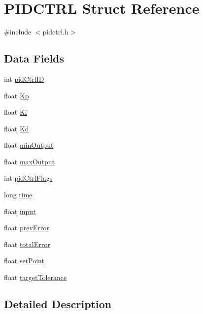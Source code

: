 \hypertarget{struct_p_i_d_c_t_r_l}{
\section{PIDCTRL Struct Reference}
\label{struct_p_i_d_c_t_r_l}
}


{\ttfamily \#include $<$pidctrl.h$>$}

\subsection*{Data Fields}
\begin{DoxyCompactItemize}
\item 
int \hyperlink{struct_p_i_d_c_t_r_l_a476d031d1a50fa42f1cebebf6e19d8a2}{pidCtrlID}
\item 
float \hyperlink{struct_p_i_d_c_t_r_l_a09cfc766a233ad617270562cc4146d07}{Kp}
\item 
float \hyperlink{struct_p_i_d_c_t_r_l_a59fac16f568541187ff485c4c47b0ec5}{Ki}
\item 
float \hyperlink{struct_p_i_d_c_t_r_l_a98268d71502ba080d88a9b1f50fdbe80}{Kd}
\item 
float \hyperlink{struct_p_i_d_c_t_r_l_aa600beb284fe9eb85dd0e23dbb76ea12}{minOutput}
\item 
float \hyperlink{struct_p_i_d_c_t_r_l_a69c7c584610d93d038b17f08d46b4fa1}{maxOutput}
\item 
int \hyperlink{struct_p_i_d_c_t_r_l_a22df833968e881351b347f467627da04}{pidCtrlFlags}
\item 
long \hyperlink{struct_p_i_d_c_t_r_l_a8667588dec524bf854d0c16771d425a1}{time}
\item 
float \hyperlink{struct_p_i_d_c_t_r_l_a0c92b536886cab3f637dce4b7a0956bd}{input}
\item 
float \hyperlink{struct_p_i_d_c_t_r_l_a39a4faa3bd5fbec63bad922745e90e53}{prevError}
\item 
float \hyperlink{struct_p_i_d_c_t_r_l_a4493bf9bc4dbf87a1d24fdd875b89dde}{totalError}
\item 
float \hyperlink{struct_p_i_d_c_t_r_l_a63d3c3044414027c2686db00ea9cca32}{setPoint}
\item 
float \hyperlink{struct_p_i_d_c_t_r_l_ac9724415d7343c756012787cb48fcbe3}{targetTolerance}
\end{DoxyCompactItemize}


\subsection{Detailed Description}


